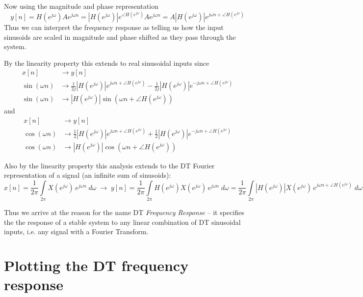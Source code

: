 Now using the magnitude and phase representation
\[
y[n] = H\left(e^{j\omega}\right) A e^{j\omega n} = |H\left(e^{j\omega}\right)|e^{\angle H\left(e^{j\omega}\right)} A e^{j\omega n} = A |H\left(e^{j\omega}\right)| e^{j\omega n + \angle H\left(e^{j\omega}\right)} 
\]
Thus we can interpret the frequency response as telling us how the input sinusoids are scaled in magnitude and phase shifted as they pass through the system.

By the linearity property this extends to real sinusoidal inputs since
\begin{align*}
  x[n] &\longrightarrow y[n]\\
  \sin(\omega n) &\longrightarrow \frac{1}{2j}|H\left(e^{j\omega}\right)| e^{j\omega n + \angle H\left(e^{j\omega}\right)} - \frac{1}{2j}|H\left(e^{j\omega}\right)| e^{-j\omega n + \angle H\left(e^{j\omega}\right)}\\
  \sin(\omega n) &\longrightarrow |H\left(e^{j\omega}\right)|\sin(\omega n + \angle H\left(e^{j\omega}\right))  
\end{align*}
and
\begin{align*}
  x[n] &\longrightarrow y[n]\\
  \cos(\omega n) &\longrightarrow \frac{1}{2}|H\left(e^{j\omega}\right)| e^{j\omega n + \angle H\left(e^{j\omega}\right)} + \frac{1}{2}|H\left(e^{j\omega}\right)| e^{-j\omega n + \angle H\left(e^{j\omega}\right)}\\
  \cos(\omega n) &\longrightarrow |H\left(e^{j\omega}\right)|\cos(\omega n + \angle H\left(e^{j\omega}\right))  
\end{align*}

Also by the linearity property this analysis extends to the DT Fourier representation of a signal (an infinite sum of sinusoids):
\[
x[n] = \frac{1}{2\pi}\int\limits_{2\pi} X\left(e^{j \omega}\right) \, e^{j \omega n}\; d\omega \;\longrightarrow\; y[n] = \frac{1}{2\pi}\int\limits_{2\pi} H\left(e^{j \omega}\right) X\left(e^{j \omega}\right) \, e^{j \omega n}\; d\omega = \frac{1}{2\pi}\int\limits_{2\pi} \left| H\left(e^{j\omega}\right)\right| X\left(e^{j\omega}\right) \, e^{j \omega n + \angle H\left(e^{j\omega}\right)}\; d\omega
\]

Thus we arrive at the reason for the name DT \textit{Frequency Response} -- it specifies the the response of a stable system to any linear combination of DT sinusoidal inputs, i.e. any signal with a Fourier Transform.

\section{Plotting the DT frequency response}

